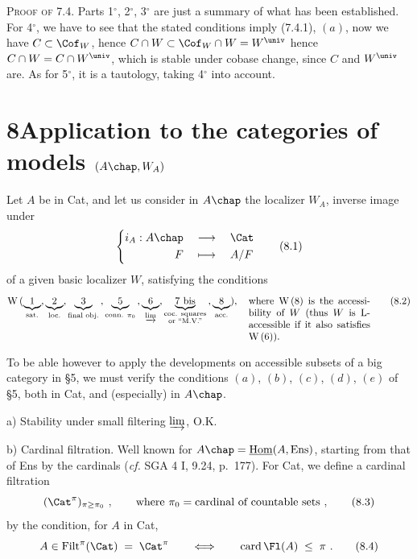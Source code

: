 \textsc{Proof of} 7.4. Parts 1$^\circ$, 2$^\circ$, 3$^\circ$ are just a summary of what has been established. For 4$^\circ$, we have to see that the stated conditions imply (7.4.1), $(a)$, now we have $C\subset \Cof_W$, hence $C\cap W\subset \Cof_W\cap W = W^{\univ}$
hence $C\cap W = C\cap W^{\univ}$, which is stable under cobase change, since $C$ and $W^{\univ}$ are. As for 5$^\circ$, it is a tautology, taking 4$^\circ$ into account.

\section*{8\quad Application to the categories of models $(A\chap,W_A)$}

Let $A$ be in Cat, and let us consider in $A\chap$ the localizer $W_A$, inverse image under
\[
\left\{
\begin{aligned}
i_A : A\chap \quad &\longrightarrow \quad \Cat\\
F \quad &\longmapsto \quad A/F
\end{aligned}
\right.
\tag*{(8.1)}
\]
of a given basic localizer $W$, satisfying the conditions
\[
\mathrm{W}\,(\underbrace{1}_{\text{sat.}},\underbrace{2}_{\text{loc.}},\underbrace{3}_{\text{final obj.}}\,,\underbrace{5}_{\text{conn. }\pi_0}\,,\underbrace{6}_{\varinjlim},\underbrace{7\text{ bis}}_{\substack{\text{coc. squares}\\ \text{or ``M.V.''}}}\,,\underbrace{8}_{\text{acc.}}),\quad
\text{\parbox[t]{4.3cm}{where W\,(8) is the accessibility of $W$ (thus $W$ is L-accessible if it also satisfies W\,(6)).}}
\tag*{(8.2)}
\]

To be able however to apply the developments on accessible subsets of a big category in §5, we must verify the conditions $(a)$, $(b)$, $(c)$, $(d)$, $(e)$ of §5, both in Cat, and (especially) in $A\chap$.

a) Stability under small filtering $\varinjlim$, O.K.

b) Cardinal filtration. Well known for $A\chap = \underline{\mathrm{Hom}}(A,\mathrm{Ens})$, starting from that of Ens by the cardinals (\textit{cf.} SGA 4 I, 9.24, p.~177). For Cat, we define a cardinal filtration
\[
(\Cat^{\pi})_{\pi\geq\pi_0}\ , \qquad \text{where } \pi_0 = \text{cardinal of countable sets}\ ,
\tag*{(8.3)}
\]
by the condition, for $A$ in Cat,
\[
A\in \mathrm{Filt}^{\pi}(\Cat) \;=\; \Cat^{\pi} \qquad\Longleftrightarrow\qquad \operatorname{card}\Fl(A) \;\leq\; \pi\ .
\tag*{(8.4)}
\]

